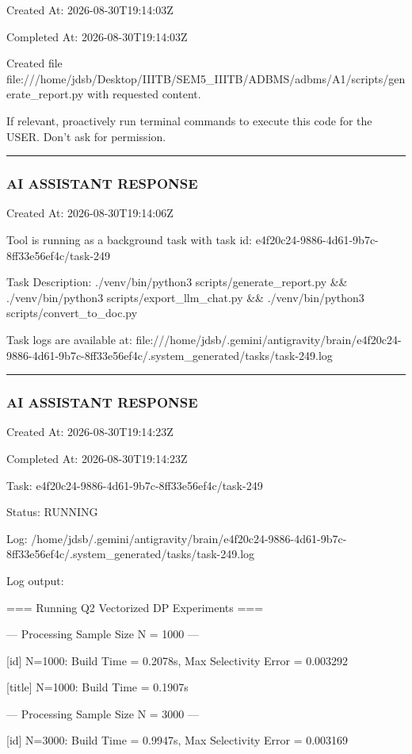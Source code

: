 \documentclass[11pt,a4paper]{article}
\begin{document}
{Created At: 2026-08-30T19:14:03Z

Completed At: 2026-08-30T19:14:03Z

Created file file:///home/jdsb/Desktop/IIITB/SEM5\_IIITB/ADBMS/adbms/A1/scripts/generate\_report.py with requested content.

If relevant, proactively run terminal commands to execute this code for the USER. Don't ask for permission.


\hrule

\subsubsection{AI ASSISTANT RESPONSE}

Created At: 2026-08-30T19:14:06Z

Tool is running as a background task with task id: e4f20c24-9886-4d61-9b7c-8ff33e56ef4c/task-249

Task Description: ./venv/bin/python3 scripts/generate\_report.py \&\& ./venv/bin/python3 scripts/export\_llm\_chat.py \&\& ./venv/bin/python3 scripts/convert\_to\_doc.py

Task logs are available at: file:///home/jdsb/.gemini/antigravity/brain/e4f20c24-9886-4d61-9b7c-8ff33e56ef4c/.system\_generated/tasks/task-249.log


\hrule

\subsubsection{AI ASSISTANT RESPONSE}

Created At: 2026-08-30T19:14:23Z

Completed At: 2026-08-30T19:14:23Z

Task: e4f20c24-9886-4d61-9b7c-8ff33e56ef4c/task-249

Status: RUNNING

Log: /home/jdsb/.gemini/antigravity/brain/e4f20c24-9886-4d61-9b7c-8ff33e56ef4c/.system\_generated/tasks/task-249.log

Log output:

=== Running Q2 Vectorized DP Experiments ===


--- Processing Sample Size N = 1000 ---

[id] N=1000: Build Time = 0.2078s, Max Selectivity Error = 0.003292

[title] N=1000: Build Time = 0.1907s


--- Processing Sample Size N = 3000 ---

[id] N=3000: Build Time = 0.9947s, Max Selectivity Error = 0.003169

}
\end{document}
